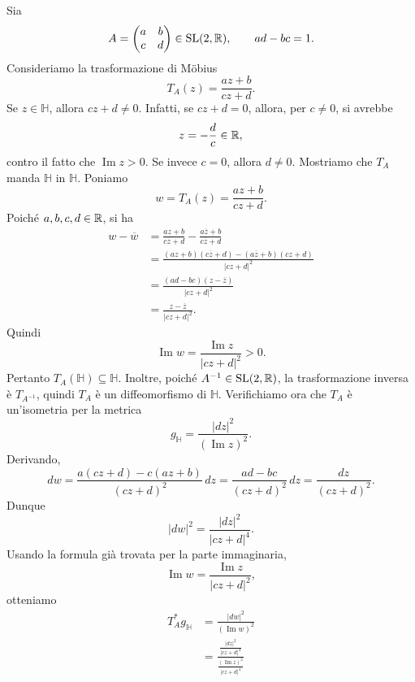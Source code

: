 \documentclass[a4paper]{article}
\begin{document}
\begin{snippetproof}{}
    Sia
    \[
        A=
        \begin{pmatrix}
            a & b\\
            c & d
        \end{pmatrix}
        \in\operatorname{SL}(2,\mathbb{R}),
        \qquad
        ad-bc=1.
    \]
    Consideriamo la trasformazione di Möbius
    \[
        T_A(z)=\frac{az+b}{cz+d}.
    \]
    Se \(z\in\mathbb{H}\), allora \(cz+d\neq0\). Infatti, se \(cz+d=0\), allora, per \(c\neq0\), si avrebbe
    \[
        z=-\frac dc\in\mathbb{R},
    \]
    contro il fatto che \(\operatorname{Im}z>0\). Se invece \(c=0\), allora \(d\neq0\).
    Mostriamo che \(T_A\) manda \(\mathbb{H}\) in \(\mathbb{H}\). Poniamo
    \[
        w=T_A(z)=\frac{az+b}{cz+d}.
    \]
    Poiché \(a,b,c,d\in\mathbb{R}\), si ha
    \begin{align*}
        w-\overline{w}
        &=
        \frac{az+b}{cz+d}
        -
        \frac{a\overline z+b}{c\overline z+d}\\
        &=
        \frac{(az+b)(c\overline z+d)-(a\overline z+b)(cz+d)}{|cz+d|^2}\\
        &=
        \frac{(ad-bc)(z-\overline z)}{|cz+d|^2}\\
        &=
        \frac{z-\overline z}{|cz+d|^2}.
    \end{align*}
    Quindi
    \[
        \operatorname{Im}w
        =
        \frac{\operatorname{Im}z}{|cz+d|^2}>0.
    \]
    Pertanto \(T_A(\mathbb{H})\subseteq\mathbb{H}\). Inoltre, poiché \(A^{-1}\in\operatorname{SL}(2,\mathbb{R})\), la trasformazione inversa è \(T_{A^{-1}}\), quindi \(T_A\) è un diffeomorfismo di \(\mathbb{H}\).
    Verifichiamo ora che \(T_A\) è un'isometria per la metrica
    \[
        g_{\mathbb{H}}=\frac{|dz|^2}{(\operatorname{Im}z)^2}.
    \]
    Derivando,
    \[
        dw
        =
        \frac{a(cz+d)-c(az+b)}{(cz+d)^2}\,dz
        =
        \frac{ad-bc}{(cz+d)^2}\,dz
        =
        \frac{dz}{(cz+d)^2}.
    \]
    Dunque
    \[
        |dw|^2
        =
        \frac{|dz|^2}{|cz+d|^4}.
    \]
    Usando la formula già trovata per la parte immaginaria,
    \[
        \operatorname{Im}w
        =
        \frac{\operatorname{Im}z}{|cz+d|^2},
    \]
    otteniamo
    \begin{align*}
        T_A^*g_{\mathbb{H}}
        &=
        \frac{|dw|^2}{(\operatorname{Im}w)^2}\\
        &=
        \frac{\frac{|dz|^2}{|cz+d|^4}}
        {\frac{(\operatorname{Im}z)^2}{|cz+d|^4}}\\

\end{align*}
\end{snippetproof}
\end{document}

